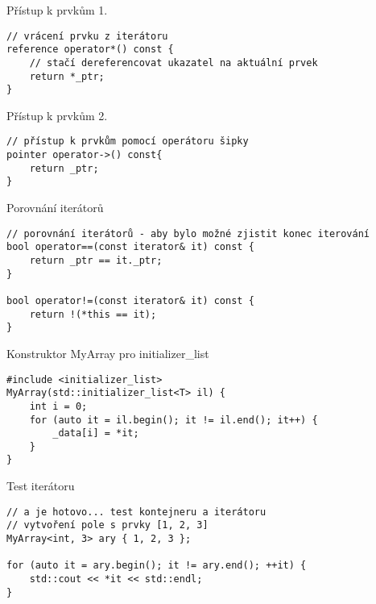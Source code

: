 \begin{frame}[fragile]
\begin{exampleblock}{{\YES} Přístup k prvkům 1.}
\begin{lstlisting}
// vrácení prvku z iterátoru
reference operator*() const {
	// stačí dereferencovat ukazatel na aktuální prvek
	return *_ptr;
}
\end{lstlisting}
\end{exampleblock}	
\end{frame}

\begin{frame}[fragile]
\begin{exampleblock}{{\YES} Přístup k prvkům 2.}
\begin{lstlisting}
// přístup k prvkům pomocí operátoru šipky
pointer operator->() const{
	return _ptr;
}    	
\end{lstlisting}
\end{exampleblock}	
\end{frame}


\begin{frame}[fragile]
\begin{exampleblock}{{\YES} Porovnání iterátorů}
\begin{lstlisting}
// porovnání iterátorů - aby bylo možné zjistit konec iterování
bool operator==(const iterator& it) const {
	return _ptr == it._ptr;
}

bool operator!=(const iterator& it) const {
	return !(*this == it);
}	
\end{lstlisting}
\end{exampleblock}	
\end{frame}


\begin{frame}[fragile]
\begin{exampleblock}{{\YES} Konstruktor MyArray pro initializer\_list}
\begin{lstlisting}
#include <initializer_list>		
MyArray(std::initializer_list<T> il) {
	int i = 0;
	for (auto it = il.begin(); it != il.end(); it++) {
		_data[i] = *it;
	}
}
\end{lstlisting}
\end{exampleblock}		

\begin{exampleblock}{{\YES} Test iterátoru}
\begin{lstlisting}
// a je hotovo... test kontejneru a iterátoru
// vytvoření pole s prvky [1, 2, 3]
MyArray<int, 3> ary { 1, 2, 3 };

for (auto it = ary.begin(); it != ary.end(); ++it) {
	std::cout << *it << std::endl;
}
\end{lstlisting}
\end{exampleblock}	
\end{frame}

